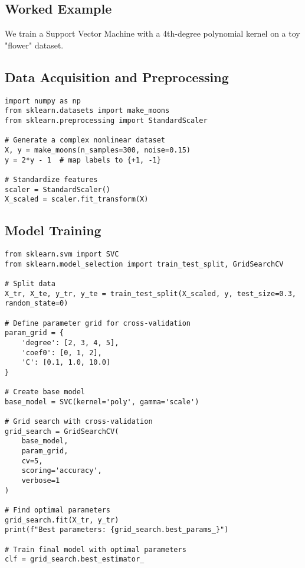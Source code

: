 \documentclass[11pt]{article}
\begin{document}
\subsection{Worked Example}
We train a Support Vector Machine with a 4th-degree polynomial kernel on a toy "flower" dataset.

\subsection{Data Acquisition and Preprocessing}
\begin{lstlisting}
import numpy as np
from sklearn.datasets import make_moons
from sklearn.preprocessing import StandardScaler

# Generate a complex nonlinear dataset
X, y = make_moons(n_samples=300, noise=0.15)
y = 2*y - 1  # map labels to {+1, -1}

# Standardize features
scaler = StandardScaler()
X_scaled = scaler.fit_transform(X)
\end{lstlisting}

\subsection{Model Training}
\begin{lstlisting}
from sklearn.svm import SVC
from sklearn.model_selection import train_test_split, GridSearchCV

# Split data
X_tr, X_te, y_tr, y_te = train_test_split(X_scaled, y, test_size=0.3, random_state=0)

# Define parameter grid for cross-validation
param_grid = {
    'degree': [2, 3, 4, 5],
    'coef0': [0, 1, 2],
    'C': [0.1, 1.0, 10.0]
}

# Create base model
base_model = SVC(kernel='poly', gamma='scale')

# Grid search with cross-validation
grid_search = GridSearchCV(
    base_model, 
    param_grid, 
    cv=5, 
    scoring='accuracy',
    verbose=1
)

# Find optimal parameters
grid_search.fit(X_tr, y_tr)
print(f"Best parameters: {grid_search.best_params_}")

# Train final model with optimal parameters
clf = grid_search.best_estimator_
\end{lstlisting}
\end{document}
